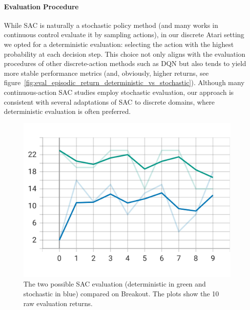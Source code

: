 \paragraph{Evaluation Procedure}
While SAC is naturally a stochastic policy method (and many works in continuous control evaluate it by sampling actions), in our discrete Atari setting we opted for a deterministic evaluation: selecting the action with the highest probability at each decision step. This choice not only aligns with the evaluation procedures of other discrete-action methods such as DQN but also tends to yield more stable performance metrics (and, obviously, higher returns, see figure~\vref{fig:eval_episodic_return_deterministic_vs_stochastic}). Although many continuous-action SAC studies employ stochastic evaluation, our approach is consistent with several adaptations of SAC to discrete domains, where deterministic evaluation is often preferred.

\begin{figure}
	\centering
	\includegraphics[width=.5\textwidth]{figures/sac/eval_episodic_return_deterministic_vs_stochastic.jpeg}
	\caption{The two possible SAC evaluation (deterministic in green and stochastic in blue) compared on Breakout. The plots show the 10 raw evaluation returns.}
	\label{fig:eval_episodic_return_deterministic_vs_stochastic}
\end{figure}

